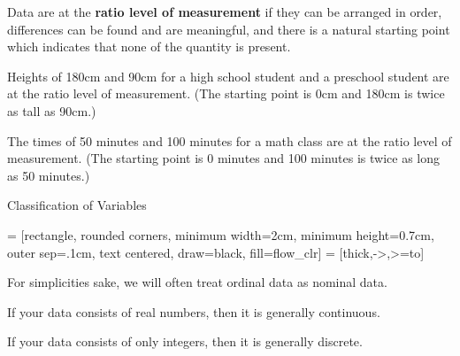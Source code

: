 \documentclass{beamer}
\begin{document}
\begin{frame}
\begin{definition}
Data are at the \textbf{ratio level of measurement} if they can be arranged in order, differences can be found and are meaningful, and there is a natural starting point which indicates that none of the quantity is present. 
\end{definition}\pause

\begin{example}
Heights of 180cm and 90cm for a high school student and a preschool student are at the ratio level of measurement. (The starting point is 0cm and 180cm is twice as tall as 90cm.)
\end{example}\pause

\begin{example}
The times of 50 minutes and 100 minutes for a math class are at the ratio level of measurement. (The starting point is 0 minutes and 100 minutes is twice as long as 50 minutes.)
\end{example}
\end{frame}

\begin{frame}
\begin{block}{Classification of Variables}
\begin{center}
 = [rectangle, rounded corners, minimum width=2cm, minimum height=0.7cm, outer sep=.1cm, text centered, draw=black, fill=flow_clr]
 = [thick,->,>=to]
\end{center}
\end{block}\pause

\begin{note}
For simplicities sake, we will often treat ordinal data as nominal data.
\end{note}\pause 
\begin{note} 
If your data consists of real numbers, then it is generally continuous.
\end{note}\pause

\begin{note}
If your data consists of only integers, then it is generally discrete.
\end{note}
\end{frame}
\end{document}
